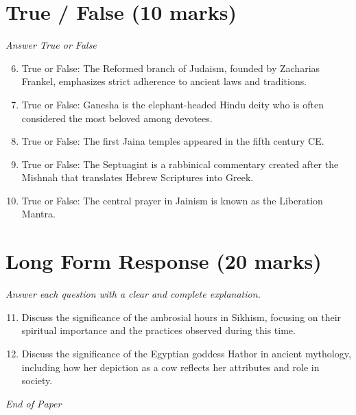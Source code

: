 \documentclass[12pt]{article}
\begin{document}
\section*{True / False (10 marks)}
\textit{Answer True or False}
\begin{enumerate}[label=\arabic*.]
\setcounter{enumi}{5}
\item True or False: The Reformed branch of Judaism, founded by Zacharias Frankel, emphasizes strict adherence to ancient laws and traditions.
\item True or False: Ganesha is the elephant-headed Hindu deity who is often considered the most beloved among devotees.
\item True or False: The first Jaina temples appeared in the fifth century CE.
\item True or False: The Septuagint is a rabbinical commentary created after the Mishnah that translates Hebrew Scriptures into Greek.
\item True or False: The central prayer in Jainism is known as the Liberation Mantra.
\end{enumerate}

\section*{Long Form Response (20 marks)}
\textit{Answer each question with a clear and complete explanation.}
\begin{enumerate}[label=\arabic*.]
\setcounter{enumi}{10}
\item Discuss the significance of the ambrosial hours in Sikhism, focusing on their spiritual importance and the practices observed during this time.
\item Discuss the significance of the Egyptian goddess Hathor in ancient mythology, including how her depiction as a cow reflects her attributes and role in society.
\end{enumerate}

\vfill
\noindent\textit{End of Paper}
\end{document}
